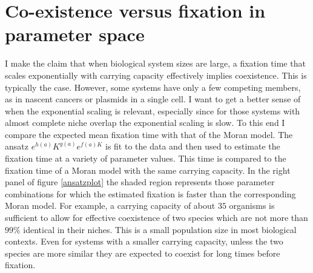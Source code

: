 \section{Co-existence versus fixation in parameter space}

I make the claim that when biological system sizes are large, a fixation time that scales exponentially with carrying capacity effectively implies coexistence. 
This is typically the case. 
However, some systems have only a few competing members, as in nascent cancers or plasmids in a single cell. 
I want to get a better sense of when the exponential scaling is relevant, especially since for those systems with almost complete niche overlap the exponential scaling is slow. 
To this end I compare the expected mean fixation time with that of the Moran model. 
The ansatz $e^{h(a)}K^{g(a)}e^{f(a)K}$ is fit to the data and then used to estimate the fixation time at a variety of parameter values. 
This time is compared to the fixation time of a Moran model with the same carrying capacity. 
In the right panel of figure \ref{ansatzplot} the shaded region represents those parameter combinations for which the estimated fixation is faster than the corresponding Moran model. 
For example, a carrying capacity of about $35$ organisms is sufficient to allow for effective coexistence of two species which are not more than $99\%$ identical in their niches. This is a small population size in most biological contexts. 
Even for systems with a smaller carrying capacity, unless the two species are more similar they are expected to coexist for long times before fixation. 


